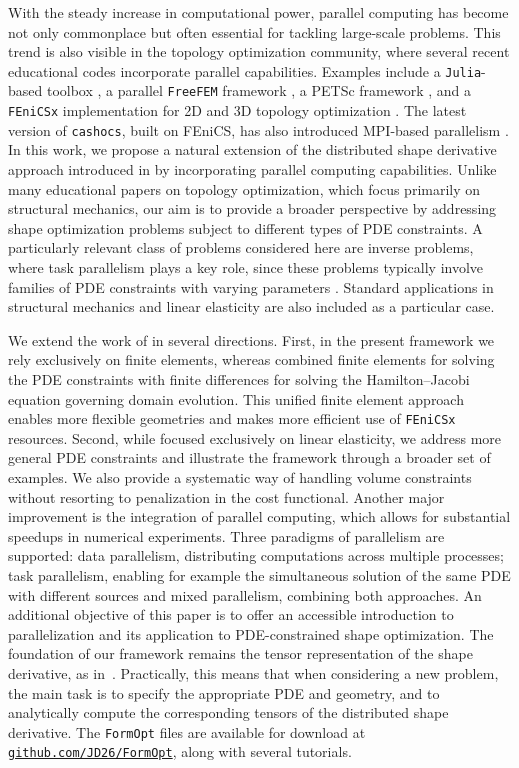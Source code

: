 \documentclass[iicol,pdflatex,sn-mathphys-ay]{sn-jnl}%
\theoremstyle{thmstyleone}%
\theoremstyle{thmstyletwo}%
\theoremstyle{thmstylethree}%
\begin{document}
With the steady increase in computational power, parallel
computing has become not only commonplace but often essential
for tackling large-scale problems. 
This trend is also visible in the topology optimization community,
where several recent educational codes incorporate parallel capabilities. 
Examples include a \texttt{Julia}-based toolbox \citep{Wegert2025},
a parallel \texttt{FreeFEM} framework \citep{MR4916810}, a PETSc
framework \citep{MR3334238}, and a \texttt{FEniCSx} implementation for
2D and 3D topology optimization \citep{Jia2024}.
The latest version of \texttt{cashocs}, built on FEniCS, has also introduced
MPI-based parallelism \citep{BLAUTH2021100646,BLAUTH2023101577}.
In this work, we propose a natural extension of the distributed
shape derivative approach introduced in \cite{MR3843884}
by incorporating parallel computing capabilities.
Unlike many educational papers on topology optimization, which
focus primarily on structural mechanics, our aim is to provide
a broader perspective by addressing shape optimization problems
subject to different types of PDE constraints.
A particularly relevant class of problems considered here are
inverse problems, where task parallelism plays a key role,
since these problems typically involve families of PDE
constraints with varying parameters \citep{MR4261115}.
Standard applications in  structural mechanics and linear
elasticity are also included as a particular case.

We extend the work of \cite{MR3843884} in several directions. 
First, in the present framework we rely exclusively on finite elements,
whereas \cite{MR3843884} combined finite elements for solving the PDE
constraints with finite differences for solving the Hamilton--Jacobi
equation governing domain evolution. This unified finite element
approach enables more flexible geometries and makes more efficient
use of \texttt{FEniCSx} resources.
Second, while \cite{MR3843884} focused exclusively on linear elasticity,
we address more general PDE constraints and illustrate
the framework through a broader set of examples. 
We also provide a systematic way of handling volume constraints without
resorting to penalization in the cost functional.
Another major improvement is the integration of parallel computing,
which allows for substantial speedups in numerical experiments. 
Three paradigms of parallelism are supported: data parallelism,
distributing computations across multiple processes; task parallelism,
enabling for example the simultaneous solution of the same PDE
with different sources and mixed parallelism, combining both approaches.
An additional objective of this paper is to offer an accessible
introduction to parallelization and its application to
PDE-constrained shape optimization.
The foundation of our framework remains the tensor representation of
the shape derivative, as in~\cite{MR3843884}. Practically,
this means that when considering a new problem, the main task
is to specify the appropriate PDE and geometry, and to analytically
compute the corresponding tensors of the distributed shape derivative.
The \texttt{FormOpt} files are available for download at 
\href{https://github.com/JD26/FormOpt}{\texttt{github.com/JD26/FormOpt}}, 
along with several tutorials.
\end{document}
